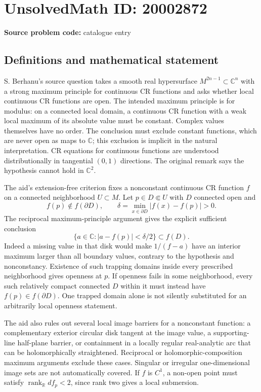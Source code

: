 \documentclass[11pt]{article}
\newcommand{\R}{\mathbb{R}}
\newcommand{\C}{\mathbb{C}}
\begin{document}
\section*{UnsolvedMath ID: 20002872}
\textbf{Source problem code:} catalogue entry
\subsection{Definitions and mathematical statement}
S. Berhanu's source question takes a smooth real hypersurface $M^{2n-1}\subset\C^n$ with a strong maximum principle for continuous CR functions and asks whether local continuous CR functions are open. The intended maximum principle is for modulus: on a connected local domain, a continuous CR function with a weak local maximum of its absolute value must be constant. Complex values themselves have no order. The conclusion must exclude constant functions, which are never open as maps to $\C$; this exclusion is implicit in the natural interpretation. CR equations for continuous functions are understood distributionally in tangential $(0,1)$ directions. The original remark says the hypothesis cannot hold in $\C^2$.

The aid's extension-free criterion fixes a nonconstant continuous CR function $f$ on a connected neighborhood $U\subset M$. Let $p\in D\Subset U$ with $D$ connected open and
\[
 f(p)\notin f(\partial D),\qquad
 \delta=\min_{x\in\partial D}|f(x)-f(p)|>0.
\]
The reciprocal maximum-principle argument gives the explicit sufficient conclusion
\[
 \{a\in\C:|a-f(p)|<\delta/2\}\subset f(D).
\]
Indeed a missing value in that disk would make $1/(f-a)$ have an interior maximum larger than all boundary values, contrary to the hypothesis and nonconstancy. Existence of such trapping domains inside every prescribed neighborhood gives openness at $p$. If openness fails in some neighborhood, every such relatively compact connected $D$ within it must instead have $f(p)\in f(\partial D)$. One trapped domain alone is not silently substituted for an arbitrarily local openness statement.

The aid also rules out several local image barriers for a nonconstant function: a complementary exterior circular disk tangent at the image value, a supporting-line half-plane barrier, or containment in a locally regular real-analytic arc that can be holomorphically straightened. Reciprocal or holomorphic-composition maximum arguments exclude these cases. Singular or irregular one-dimensional image sets are not automatically covered. If $f$ is $C^1$, a non-open point must satisfy $\operatorname{rank}_\R df_p<2$, since rank two gives a local submersion.
\end{document}
